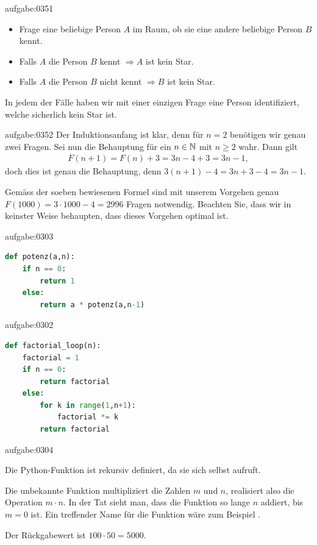 \begin{antwort}{aufgabe:0351}
\begin{itemize}
    \item Frage eine beliebige Person $A$ im Raum, ob sie eine andere beliebige Person $B$ kennt.
    \item Falls $A$ die Person $B$ kennt $\Rightarrow A$ ist kein Star.
    \item Falls $A$ die Person $B$ nicht kennt $\Rightarrow B$ ist kein Star.
\end{itemize}
In jedem der Fälle haben wir mit einer einzigen Frage eine Person identifiziert, welche sicherlich kein Star ist.
\end{antwort}


\begin{antwort}{aufgabe:0352}
Der Induktionsanfang ist klar, denn für $n = 2$ benötigen wir genau zwei Fragen. Sei nun die Behauptung für ein $n\in\mathbb{N}$ mit $n\geq 2$ wahr. Dann gilt
\begin{align*}
    F(n+1) = F(n) + 3 = 3n-4 + 3 = 3n - 1,
\end{align*}
doch dies ist genau die Behauptung, denn $3(n+1)-4 = 3n+3-4=3n-1$.

Gemäss der soeben bewiesenen Formel sind mit unserem Vorgehen genau $F(1000) = 3\cdot 1000 - 4 = 2996$ Fragen notwendig. Beachten Sie, dass wir in keinster Weise behaupten, dass dieses Vorgehen optimal ist.
\end{antwort}


\begin{antwort}{aufgabe:0303}
\begin{lstlisting}[language=Python,caption=rekursive Potenz-Funktion]
def potenz(a,n):
    if n == 0:
        return 1
    else:
        return a * potenz(a,n-1)
\end{lstlisting}
\end{antwort}


\begin{antwort}{aufgabe:0302}
\begin{lstlisting}[language=Python,caption=rekursive Potenz-Funktion]
def factorial_loop(n):
    factorial = 1
    if n == 0:
        return factorial
    else:
        for k in range(1,n+1):
            factorial *= k
        return factorial
\end{lstlisting}
\end{antwort}


\begin{antwort}{aufgabe:0304}
\begin{aenum}
    \item Die Python-Funktion ist rekursiv definiert, da sie sich selbst aufruft.
    \item Die unbekannte Funktion multipliziert die Zahlen $m$ und $n$, realisiert also die Operation $m\cdot n$. In der Tat sieht man, dass die Funktion so lange $n$ addiert, bis $m = 0$ ist. Ein treffender Name für die Funktion wäre zum Beispiel .
    \item Der Rückgabewert ist $100\cdot 50 = 5000$.
\end{aenum}
\end{antwort}


